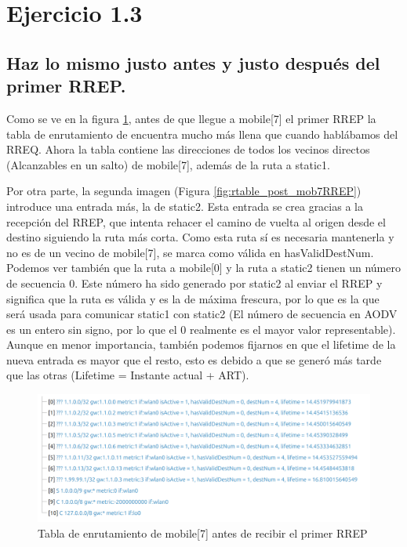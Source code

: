 \vspace{1.25cm}
\section{Ejercicio 1.3}

\subsection{Haz lo mismo justo antes y justo después del primer RREP.}

Como se ve en la figura \ref{fig:rtable_prev_mob7RREP}, antes de que llegue a mobile[7] el primer RREP la tabla de enrutamiento de encuentra mucho más llena que cuando hablábamos del RREQ. Ahora la tabla contiene las direcciones de todos los vecinos directos (Alcanzables en un salto) de mobile[7], además de la ruta a static1.

Por otra parte, la segunda imagen (Figura \ref{fig:rtable_post_mob7RREP}) introduce una entrada más, la de static2. Esta entrada se crea gracias a la recepción del RREP, que intenta rehacer el camino de vuelta al origen desde el destino siguiendo la ruta más corta. Como esta ruta sí es necesaria mantenerla y no es de un vecino de mobile[7], se marca como válida en hasValidDestNum. Podemos ver también que la ruta a mobile[0] y la ruta a static2 tienen un número de secuencia 0. Este número ha sido generado por static2 al enviar el RREP y significa que la ruta es válida y es la de máxima frescura, por lo que es la que será usada para comunicar static1 con static2 (El número de secuencia en AODV es un entero sin signo, por lo que el 0 realmente es el mayor valor representable). Aunque en menor importancia, también podemos fijarnos en que el lifetime de la nueva entrada es mayor que el resto, esto es debido a que se generó más tarde que las otras (Lifetime = Instante actual + ART).

\begin{figure}[H]
    \centering
    \includegraphics[width=125mm, scale=0.75]{imaxes/aodv/ejercicio3_1.png}
    \caption{Tabla de enrutamiento de mobile[7] antes de recibir el primer RREP}
    \label{fig:rtable_prev_mob7RREP}
\end{figure}

